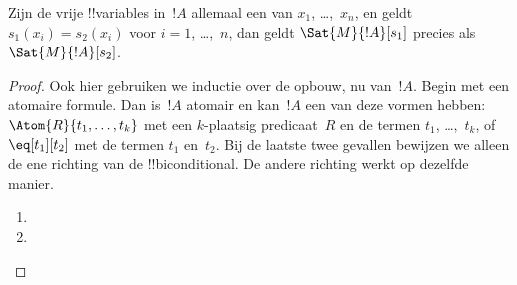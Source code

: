 \documentclass[../../../include/open-logic-section]{subfiles}
\begin{document}
\begin{prop}
Zijn de vrije !!{variable}s in~$!A$ allemaal een van
$x_1$, \dots,~$x_n$, en geldt $s_1(x_i) = s_2(x_i)$ voor
$i = 1$, \dots,~$n$, dan geldt $\Sat{M}{!A}[s_1]$ precies als
$\Sat{M}{!A}[s_2]$.
\end{prop}

\begin{proof}
Ook hier gebruiken we inductie over de opbouw, nu van~$!A$. Begin met
een atomaire formule. Dan is~$!A$ atomair en kan~$!A$ een van deze
vormen hebben:
$\Atom{R}{t_1, \dots, t_k}$ met een $k$-plaatsig predicaat~$R$ en de
termen $t_1$, \dots,~$t_k$, of $\eq[t_1][t_2]$ met de termen $t_1$
en~$t_2$. Bij de laatste twee gevallen bewijzen we alleen de ene
richting van de !!{biconditional}. De andere richting werkt op
dezelfde manier.

\begin{enumerate}


\item
\item
\end{enumerate}


\end{proof}
\end{document}
